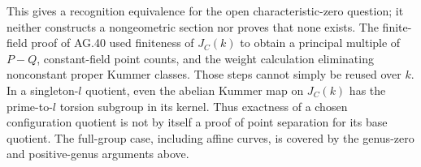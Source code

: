 \documentclass[11pt,a4paper]{article}
\begin{document}
This gives a recognition equivalence for the open characteristic-zero
question; it neither constructs a nongeometric section nor proves
that none exists. The finite-field proof of AG.40 used finiteness of
$J_C(k)$ to obtain a principal multiple of $P-Q$, constant-field point
counts, and the weight calculation eliminating nonconstant proper
Kummer classes. Those steps cannot simply be reused over $k$.
In a singleton-$l$ quotient, even the abelian Kummer map on $J_C(k)$
has the prime-to-$l$ torsion subgroup in its kernel. Thus exactness of
a chosen configuration quotient is not by itself a proof of point
separation for its base quotient. The full-group case, including
affine curves, is covered by the genus-zero and positive-genus
arguments above.\citep[\S1.2]{LA_CiperianiStix2015}



\end{document}
